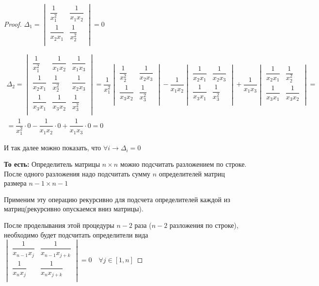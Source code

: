 \documentclass[a4paper,12pt]{article}
\newcommand{\dfr}{\dfrac}
\begin{document}
\begin{proof}
$\Delta_1 = 
\begin{vmatrix}
\dfr{1}{x_1^2} & \dfr{1}{x_1 x_2}\\
\dfr{1}{x_2 x_1} & \dfr{1}{x_2^2}\\
\end{vmatrix} = 0$

\begin{multline}
\Delta_2 =  
\begin{vmatrix}
\dfr{1}{x_1^2} & \dfr{1}{x_1 x_2}& \dfr{1}{x_1 x_3}\\
\dfr{1}{x_2 x_1} & \dfr{1}{x_2^2}& \dfr{1}{x_2 x_3}\\
\dfr{1}{x_3 x_1} & \dfr{1}{x_3 x_2}& \dfr{1}{x_3^2}\\
\end{vmatrix} 
=
\dfr{1}{x_1^2}
\begin{vmatrix}
\dfr{1}{x_2^2}& \dfr{1}{x_2 x_3}\\
\dfr{1}{x_3 x_2}& \dfr{1}{x_3^2}\\
\end{vmatrix}
-
\dfr{1}{x_1 x_2}
\begin{vmatrix}
\dfr{1}{x_2 x_1} &\dfr{1}{x_2 x_3}\\
\dfr{1}{x_3 x_1} &	\dfr{1}{x_3^2}\\
\end{vmatrix}
+
\dfr{1}{x_1 x_3}
\begin{vmatrix}
\dfr{1}{x_2 x_1} & \dfr{1}{x_2^2}\\
\dfr{1}{x_3 x_1} & \dfr{1}{x_3 x_2}\\
\end{vmatrix}
=\\= \dfr{1}{x_1^2} \cdot 0 - \dfr{1}{x_1 x_2} \cdot 0 + \dfr{1}{x_1 x_3}\cdot 0 = 0
\end{multline}


И так далее можно показать, что $\forall i \rightarrow \Delta_i = 0$ 

\vspace{\baselineskip}

{\bf То есть:}
Определитель матрицы $n\times n$ можно подсчитать разложением по строке. 
После одного разложения надо подсчитать сумму $n$ определителей матриц размера $n-1\times n-1$


Применим эту операцию рекурсивно для подсчета определителей каждой из матриц(рекурсивно опускаемся вниз матрицы).

После проделывания этой процедуры $n-2$ раза ($n-2$ разложения по строке), необходимо будет подсчитать определители вида  
$\begin{vmatrix} 
\dfr{1}{x_{n-1} x_j} & \dfr{1}{x_{n-1} x_{j+k}}\\
\dfr{1}{x_{n} x_j} & \dfr{1}{x_{n} x_{j+k}}\\
\end{vmatrix} = 0 \quad \forall j \in [1, n]$


\end{proof}
\end{document}
